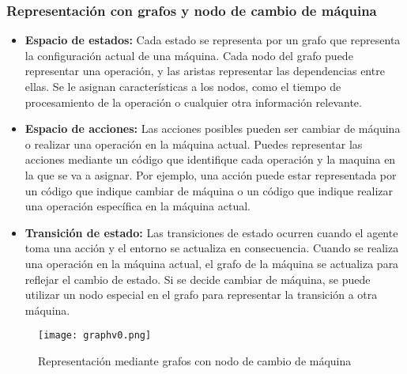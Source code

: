 \subsubsection{Representación con grafos y nodo de cambio de máquina}
\begin{itemize}
    \item \textbf{Espacio de estados:} Cada estado se representa por un grafo 
    que representa la configuración actual de una máquina. Cada nodo del grafo puede representar 
    una operación, y las aristas representar las dependencias entre ellas. Se le asignan
    características a los nodos, como el tiempo de procesamiento de la operación o cualquier 
    otra información relevante.
    \item \textbf{Espacio de acciones:} Las acciones posibles pueden ser cambiar de máquina 
    o realizar una operación en la máquina actual. Puedes representar las acciones mediante 
    un código que identifique cada operación y la maquina en la que se va a asignar. Por 
    ejemplo, una acción puede estar representada por un código que indique cambiar de máquina o 
    un código que indique realizar una operación específica en la máquina actual.
    \item \textbf{Transición de estado:} Las transiciones de estado ocurren cuando el agente 
    toma una acción y el entorno se actualiza en consecuencia. Cuando se realiza una operación 
    en la máquina actual, el grafo de la máquina se actualiza para reflejar el cambio de estado. 
    Si se decide cambiar de máquina, se puede utilizar un nodo especial en el grafo para representar 
    la transición a otra máquina.
\end{itemize}
\begin{figure}[ht]
    \centering
    \texttt{[image: graphv0.png]}
    \caption{Representación mediante grafos con nodo de cambio de máquina}
    \label{fig:rep-graph-v0}
\end{figure}
